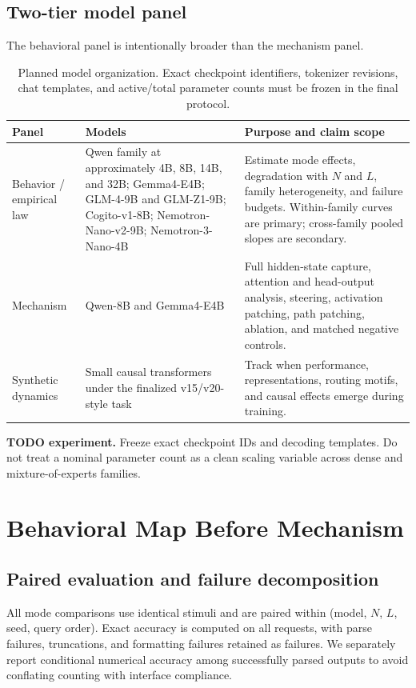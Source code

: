 \documentclass[10pt,twocolumn]{article}
\newcommand{\todoexp}[1]{%
  \par\noindent\textcolor{red!75!black}{\textbf{TODO experiment.} #1}\par}
\begin{document}
\subsection{Two-tier model panel}
The behavioral panel is intentionally broader than the mechanism panel.
\begin{table}[t]
\centering
\small
\begin{tabularx}{\textwidth}{p{}X X}
\toprule
Panel & Models & Purpose and claim scope \\
\midrule
Behavior / empirical law &
Qwen family at approximately 4B, 8B, 14B, and 32B; Gemma4-E4B;
GLM-4-9B and GLM-Z1-9B; Cogito-v1-8B; Nemotron-Nano-v2-9B;
Nemotron-3-Nano-4B &
Estimate mode effects, degradation with $N$ and $L$, family heterogeneity, and failure budgets.
Within-family curves are primary; cross-family pooled slopes are secondary. \\
Mechanism &
Qwen-8B and Gemma4-E4B &
Full hidden-state capture, attention and head-output analysis, steering, activation patching,
path patching, ablation, and matched negative controls. \\
Synthetic dynamics &
Small causal transformers under the finalized v15/v20-style task &
Track when performance, representations, routing motifs, and causal effects emerge during training. \\
\bottomrule
\end{tabularx}
\caption{Planned model organization. Exact checkpoint identifiers, tokenizer revisions, chat
templates, and active/total parameter counts must be frozen in the final protocol.}
\label{tab:modelpanels}
\end{table}

\todoexp{Freeze exact checkpoint IDs and decoding templates. Do not treat a nominal parameter
count as a clean scaling variable across dense and mixture-of-experts families.}

\section{Behavioral Map Before Mechanism}
\subsection{Paired evaluation and failure decomposition}
All mode comparisons use identical stimuli and are paired within
(model, $N$, $L$, seed, query order). Exact accuracy is computed on all requests, with parse
failures, truncations, and formatting failures retained as failures. We separately report
conditional numerical accuracy among successfully parsed outputs to avoid conflating counting
with interface compliance.
\end{document}
